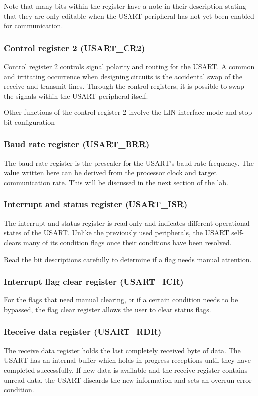 \documentclass[openany,11pt,fleqn]{book} %
\begin{document}
Note that many bits within the register have a note in their description stating that they are only editable when the USART peripheral has not yet been enabled for communication. 

\subsubsection{Control register 2 (USART\_CR2)}
Control register 2 controls signal polarity and routing for the USART. A common and irritating occurrence when designing circuits is the accidental swap of the receive and transmit lines. Through the control registers, it is possible to swap the signals within the USART peripheral itself. 

Other functions of the control register 2 involve the LIN interface mode and stop bit configuration 

\subsubsection{Baud rate register (USART\_BRR)}
The baud rate register is the prescaler for the USART's baud rate frequency. The value written here can be derived from the processor clock and target communication rate. This will be discussed in the next section of the lab.

\subsubsection{Interrupt and status register (USART\_ISR)}
The interrupt and status register is read-only and indicates different operational states of the USART. Unlike the previously used peripherals, the USART self-clears many of its condition flags once their conditions have been resolved. 

Read the bit descriptions carefully to determine if a flag needs manual attention.

\subsubsection{Interrupt flag clear register (USART\_ICR)}
For the flags that need manual clearing, or if a certain condition needs to be bypassed, the flag clear register allows the user to clear status flags. 

\subsubsection{Receive data register (USART\_RDR)}
The receive data register holds the last completely received byte of data. The USART has an internal buffer which holds in-progress receptions until they have completed successfully. If new data is available and the receive register contains unread data, the USART discards the new information and sets an overrun error condition.
\end{document}
